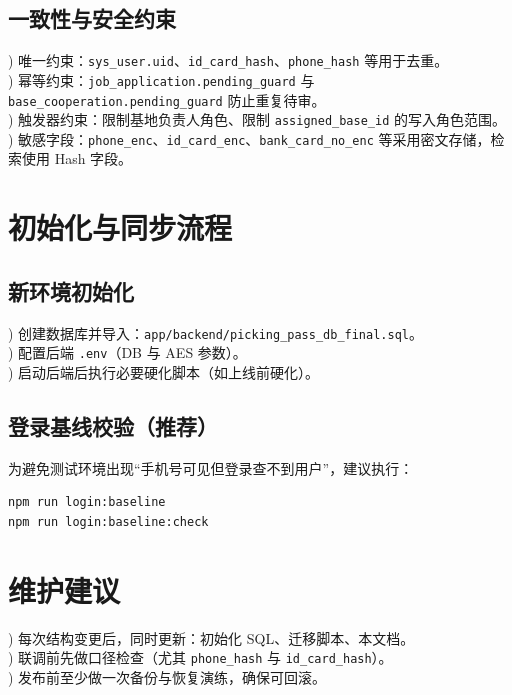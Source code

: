 \documentclass[UTF8,a4paper,fontset=none]{ctexart}
\begin{document}
\subsection{一致性与安全约束}
) 唯一约束：\texttt{sys\_user.uid}、\texttt{id\_card\_hash}、\texttt{phone\_hash} 等用于去重。\\
) 幂等约束：\texttt{job\_application.pending\_guard} 与 \texttt{base\_cooperation.pending\_guard} 防止重复待审。\\
) 触发器约束：限制基地负责人角色、限制 \texttt{assigned\_base\_id} 的写入角色范围。\\
) 敏感字段：\texttt{phone\_enc}、\texttt{id\_card\_enc}、\texttt{bank\_card\_no\_enc} 等采用密文存储，检索使用 Hash 字段。

\section{初始化与同步流程}
\subsection{新环境初始化}
) 创建数据库并导入：\texttt{app/backend/picking\_pass\_db\_final.sql}。\\
) 配置后端 \texttt{.env}（DB 与 AES 参数）。\\
) 启动后端后执行必要硬化脚本（如上线前硬化）。

\subsection{登录基线校验（推荐）}
为避免测试环境出现“手机号可见但登录查不到用户”，建议执行：

\begin{verbatim}
npm run login:baseline
npm run login:baseline:check
\end{verbatim}

\section{维护建议}
) 每次结构变更后，同时更新：初始化 SQL、迁移脚本、本文档。\\
) 联调前先做口径检查（尤其 \texttt{phone\_hash} 与 \texttt{id\_card\_hash}）。\\
) 发布前至少做一次备份与恢复演练，确保可回滚。
\end{document}
